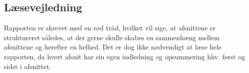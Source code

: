 \subsection{Læsevejledning}
Rapporten er skrevet med en rød tråd, hvilket vil sige, at afsnittene er struktureret således, at der gerne skulle skabes en sammenhæng mellem afsnittene og herefter en helhed. Det er dog ikke nødvendigt at læse hele rapporten, da hvert afsnit har sin egen indledning og opsummering hhv. først og sidst i afsnittet. 




